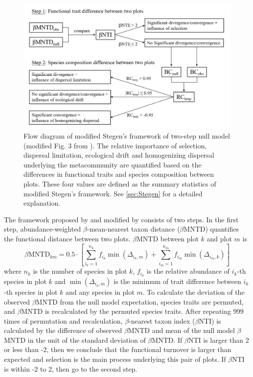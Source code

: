 \begin{figure}
	\centering
	\includegraphics[width=\linewidth]{./figures/ppt/Stegen.png}
	\caption[Flow diagram of modified Stegen's framework of two-step null model.]{\small
		Flow diagram of modified Stegen's framework of two-step null model (modified Fig. 3 from \citet{stegen2013quantifying}). The relative importance of selection, dispersal limitation, ecological drift and homogenizing dispersal underlying the metacommunity are quantified based on the differences in functional traits and species composition between plots. These four values are defined as the summary statistics of modified Stegen's framework. See \autoref{sec:Stegen} for a detailed explanation.}
	\label{fig:stegen}
\end{figure}


The framework proposed by \citet{stegen2013quantifying} and modified by \citet{ford2020functional} consists of two steps. In the first step, abundance-weighted $\beta$-mean-nearest taxon distance ($\beta$MNTD) quantifies the functional distance between two plots. $\beta$MNTD between plot $k$ and plot $m$ is 
\[
\beta \text{MNTD}_{km} = 0.5\cdot \left[\sum_{i_k = 1}^{n_k} f_{i_k}\min(\Delta_{i_k,m}) + \sum_{i_m = 1}^{n_m} f_{i_m}\min(\Delta_{i_m,k})\right]
\]
where $n_k$ is the number of species in plot $k$, $f_{i_k}$ is the relative abundance of $i_k$-th species in plot $k$ and $\min(\Delta_{i_k,m})$ is the minimum of trait difference between $i_k$-th species in plot $k$ and any species in plot $m$. To calculate the deviation of the observed $\beta$MNTD from the null model expectation, species traits are permuted, and $\beta$MNTD is recalculated by the permuted species traits. After repeating 999 times of permutation and recalculation, $\beta$-nearest taxon index ($\beta$NTI) is calculated by the difference of observed $\beta$MNTD and mean of the null model $\beta$MNTD in the unit of the standard deviation of $\beta$MNTD. If $\beta$NTI is larger than 2 or less than -2, then we conclude that the functional turnover is larger than expected and selection is the main process underlying this pair of plots. If $\beta$NTI is within -2 to 2, then go to the second step.

